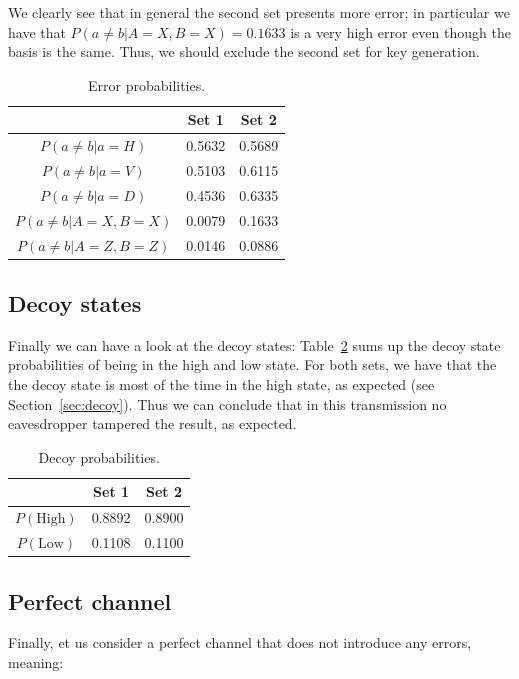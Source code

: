 \documentclass[prl,twocolumn]{revtex4-1}
\begin{document}
We clearly see that in general the second set presents more error; in particular we have that $P(a\neq b|A=X, B=X) = 0.1633$ is a very high error even though the basis is the same. Thus, we should exclude the second set for key generation. 

\begin{table}[!h]
    \centering
    \begin{tabular}{c|c|c}
            & Set 1 & Set 2 \\
            \hline
            \hline
        $P(a\neq b|a=H)$   &   0.5632  & 0.5689 \\
        \hline
        $P(a\neq b|a=V)$   &   0.5103  & 0.6115 \\
        \hline
        $P(a\neq b|a=D)$   &   0.4536  & 0.6335 \\
        \hline
        $P(a\neq b|A=X, B=X)$ & 0.0079 & 0.1633 \\
        \hline
        $P(a\neq b|A=Z, B=Z)$ & 0.0146 & 0.0886 \\
        \hline
    \end{tabular}
    \caption{Error probabilities.}
    \label{tab:QBER}
\end{table}

\subsection{Decoy states}
Finally we can have a look at the decoy states: Table~\ref{tab:decoy} sums up the decoy state probabilities of being in the high and low state. For both sets, we have that the the decoy state is most of the time in the high state, as expected (see Section~\ref{sec:decoy}). Thus we can conclude that in this transmission no eavesdropper tampered the result, as expected.


\begin{table}[!h]
    \centering
    \begin{tabular}{c|c|c}
         & Set 1 & Set 2\\
         \hline
         \hline
        $P(\text{High})$ & 0.8892 & 0.8900\\
        \hline
        $P(\text{Low})$ & 0.1108 & 0.1100\\
    \end{tabular}
    \caption{Decoy probabilities.}
    \label{tab:decoy}
\end{table}


\subsection{Perfect channel}
Finally, et us consider a perfect channel that does not introduce any errors, meaning:
\end{document}
